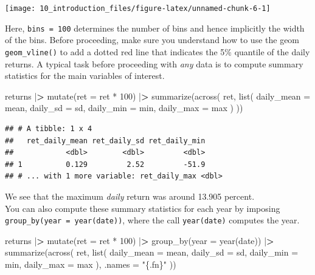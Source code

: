 \documentclass[
]{krantz}
\newenvironment{Shaded}{\begin{snugshade}}{\end{snugshade}}
\newcommand{\AttributeTok}[1]{\textcolor[rgb]{0.61,0.61,0.61}{#1}}
\newcommand{\DecValTok}[1]{\textcolor[rgb]{0.06,0.06,0.06}{#1}}
\newcommand{\ErrorTok}[1]{\textcolor[rgb]{0.14,0.14,0.14}{\textbf{#1}}}
\newcommand{\FunctionTok}[1]{\textcolor[rgb]{0,0,0}{#1}}
\newcommand{\NormalTok}[1]{#1}
\newcommand{\SpecialCharTok}[1]{\textcolor[rgb]{0,0,0}{#1}}
\newcommand{\StringTok}[1]{\textcolor[rgb]{0.5,0.5,0.5}{#1}}
\begin{document}
\begin{center}\texttt{[image: 10\_introduction\_files/figure-latex/unnamed-chunk-6-1]} \end{center}

Here, \texttt{bins\ =\ 100} determines the number of bins and hence implicitly the width of the bins.
Before proceeding, make sure you understand how to use the geom \texttt{geom\_vline()} to add a dotted red line that indicates the 5\% quantile of the daily returns.
A typical task before proceeding with \emph{any} data is to compute summary statistics for the main variables of interest.

\begin{Shaded}
\begin{Highlighting}[]
\NormalTok{returns }\SpecialCharTok{|}\ErrorTok{\textgreater{}}
  \FunctionTok{mutate}\NormalTok{(}\AttributeTok{ret =}\NormalTok{ ret }\SpecialCharTok{*} \DecValTok{100}\NormalTok{) }\SpecialCharTok{|}\ErrorTok{\textgreater{}}
  \FunctionTok{summarize}\NormalTok{(}\FunctionTok{across}\NormalTok{(}
\NormalTok{    ret,}
    \FunctionTok{list}\NormalTok{(}
      \AttributeTok{daily\_mean =}\NormalTok{ mean,}
      \AttributeTok{daily\_sd =}\NormalTok{ sd,}
      \AttributeTok{daily\_min =}\NormalTok{ min,}
      \AttributeTok{daily\_max =}\NormalTok{ max}
\NormalTok{    )}
\NormalTok{  ))}
\end{Highlighting}
\end{Shaded}

\begin{verbatim}
## # A tibble: 1 x 4
##   ret_daily_mean ret_daily_sd ret_daily_min
##            <dbl>        <dbl>         <dbl>
## 1          0.129         2.52         -51.9
## # ... with 1 more variable: ret_daily_max <dbl>
\end{verbatim}

We see that the maximum \emph{daily} return was around 13.905 percent.\\
You can also compute these summary statistics for each year by imposing \texttt{group\_by(year\ =\ year(date))}, where the call \texttt{year(date)} computes the year.

\begin{Shaded}
\begin{Highlighting}[]
\NormalTok{returns }\SpecialCharTok{|}\ErrorTok{\textgreater{}}
  \FunctionTok{mutate}\NormalTok{(}\AttributeTok{ret =}\NormalTok{ ret }\SpecialCharTok{*} \DecValTok{100}\NormalTok{) }\SpecialCharTok{|}\ErrorTok{\textgreater{}}
  \FunctionTok{group\_by}\NormalTok{(}\AttributeTok{year =} \FunctionTok{year}\NormalTok{(date)) }\SpecialCharTok{|}\ErrorTok{\textgreater{}}
  \FunctionTok{summarize}\NormalTok{(}\FunctionTok{across}\NormalTok{(}
\NormalTok{    ret,}
    \FunctionTok{list}\NormalTok{(}
      \AttributeTok{daily\_mean =}\NormalTok{ mean,}
      \AttributeTok{daily\_sd =}\NormalTok{ sd,}
      \AttributeTok{daily\_min =}\NormalTok{ min,}
      \AttributeTok{daily\_max =}\NormalTok{ max}
\NormalTok{    ),}
    \AttributeTok{.names =} \StringTok{"\{.fn\}"}
\NormalTok{  ))}
\end{Highlighting}
\end{Shaded}
\end{document}
